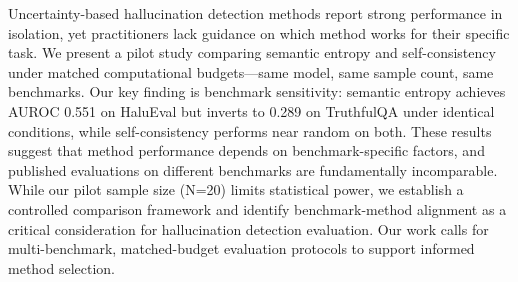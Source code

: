 Uncertainty-based hallucination detection methods report strong performance in isolation, yet practitioners lack guidance on which method works for their specific task. We present a pilot study comparing semantic entropy and self-consistency under matched computational budgets---same model, same sample count, same benchmarks. Our key finding is benchmark sensitivity: semantic entropy achieves AUROC 0.551 on HaluEval but inverts to 0.289 on TruthfulQA under identical conditions, while self-consistency performs near random on both. These results suggest that method performance depends on benchmark-specific factors, and published evaluations on different benchmarks are fundamentally incomparable. While our pilot sample size (N=20) limits statistical power, we establish a controlled comparison framework and identify benchmark-method alignment as a critical consideration for hallucination detection evaluation. Our work calls for multi-benchmark, matched-budget evaluation protocols to support informed method selection.
